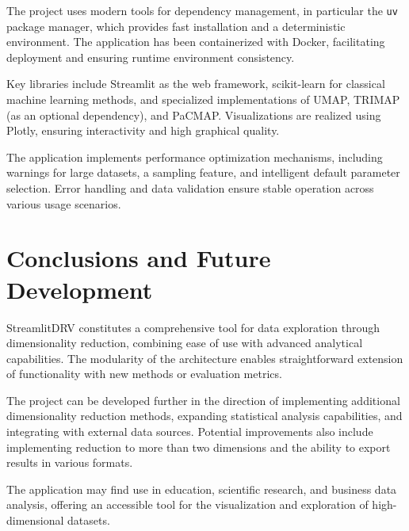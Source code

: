 \documentclass[a4paper, 12pt]{article}
\begin{document}
The project uses modern tools for dependency management, in particular the \texttt{uv} package manager, which provides fast installation and a deterministic environment. The application has been containerized with Docker, facilitating deployment and ensuring runtime environment consistency.

Key libraries include Streamlit as the web framework, scikit-learn for classical machine learning methods, and specialized implementations of UMAP, TRIMAP (as an optional dependency), and PaCMAP. Visualizations are realized using Plotly, ensuring interactivity and high graphical quality.

The application implements performance optimization mechanisms, including warnings for large datasets, a sampling feature, and intelligent default parameter selection. Error handling and data validation ensure stable operation across various usage scenarios.

\section{Conclusions and Future Development}

StreamlitDRV constitutes a comprehensive tool for data exploration through dimensionality reduction, combining ease of use with advanced analytical capabilities. The modularity of the architecture enables straightforward extension of functionality with new methods or evaluation metrics.

The project can be developed further in the direction of implementing additional dimensionality reduction methods, expanding statistical analysis capabilities, and integrating with external data sources. Potential improvements also include implementing reduction to more than two dimensions and the ability to export results in various formats.

The application may find use in education, scientific research, and business data analysis, offering an accessible tool for the visualization and exploration of high-dimensional datasets.
\end{document}
